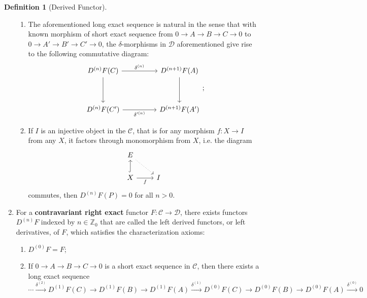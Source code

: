 \documentclass[10pt]{report}
\theoremstyle{definition}
\newtheorem{definition}{Definition}
\begin{document}
\begin{definition}[Derived Functor]
\begin{enumerate}
\begin{enumerate}
\item The aforementioned long exact sequence is natural in the sense that with known morphism of short exact sequence from $0\to A\to B\to C\to0$ to $0\to A'\to B'\to C'\to0$, the $\delta$-morphisms in $\mathcal{D}$ aforementioned give rise to the following commutative diagram:
        $$
        \begin{tikzcd}
D^{(n)}F(C) \arrow[rr, "\delta^{(n)}"] \arrow[dd] &  & D^{(n+1)}F(A) \arrow[dd] \\
                                                  &  &                          \\
D^{(n)}F(C') \arrow[rr, "\delta'^{(n)}"']         &  & D^{(n+1)}F(A')
\end{tikzcd};
        $$
\item If $I$ is an injective object in the $\mathcal{C}$, that is for any morphism $f:X\to I$ from any $X$, it factors through monomorphism from $X$, i.e. the diagram
    $$
    \begin{tikzcd}
E \arrow[rd, dotted]              &   \\
X \arrow[r, "f"'] \arrow[u, hook] & I
\end{tikzcd}
    $$
    commutes, then $D^{(n)}F(P)=0$ for all $n>0$.
\end{enumerate}

\item For a \textbf{contravariant right exact} functor $F:\mathcal{C}\to\mathcal{D}$, there exists functors $D^{(n)}F$ indexed by $n\in\mathbb{Z}_0$ that are called the left derived functors, or left derivatives, of $F$, which satisfies the characterization axioms:
\begin{enumerate}
\item $D^{(0)}F=F$;
\item If $0\to A\to B\to C\to 0$ is a short exact sequence in $\mathcal{C}$, then there exists a long exact sequence $$\cdots\overset{\delta^{(2)}}{\to}D^{(1)}F(C)\to D^{(1)}F(B)\to D^{(1)}F(A)\overset{\delta^{(1)}}{\to}D^{(0)}F(C)\to D^{(0)}F(B)\to D^{(0)}F(A)\overset{\delta^{(0)}}{\to}0$$


\end{enumerate}
\end{enumerate}
\end{definition}
\end{document}
